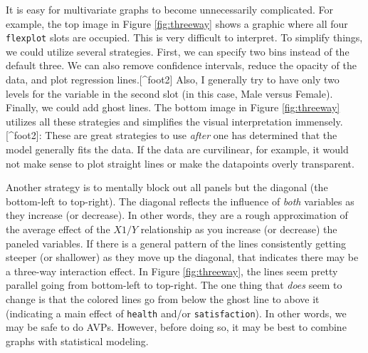 \documentclass[
  english,
  man]{apa6}
\begin{document}
It is easy for multivariate graphs to become unnecessarily complicated. For example, the top image in Figure \ref{fig:threeway} shows a graphic where all four \texttt{flexplot} slots are occupied. This is very difficult to interpret. To simplify things, we could utilize several strategies. First, we can specify two bins instead of the default three. We can also remove confidence intervals, reduce the opacity of the data, and plot regression lines.{[}\^{}foot2{]} Also, I generally try to have only two levels for the variable in the second slot (in this case, Male versus Female). Finally, we could add ghost lines. The bottom image in Figure \ref{fig:threeway} utilizes all these strategies and simplifies the visual interpretation immensely.
{[}\^{}foot2{]}: These are great strategies to use \emph{after} one has determined that the model generally fits the data. If the data are curvilinear, for example, it would not make sense to plot straight lines or make the datapoints overly transparent.

Another strategy is to mentally block out all panels but the diagonal (the bottom-left to top-right). The diagonal reflects the influence of \emph{both} variables as they increase (or decrease). In other words, they are a rough approximation of the average effect of the \(X1/Y\) relationship as you increase (or decrease) the paneled variables. If there is a general pattern of the lines consistently getting steeper (or shallower) as they move up the diagonal, that indicates there may be a three-way interaction effect. In Figure \ref{fig:threeway}, the lines seem pretty parallel going from bottom-left to top-right. The one thing that \emph{does} seem to change is that the colored lines go from below the ghost line to above it (indicating a main effect of \texttt{health} and/or \texttt{satisfaction}). In other words, we may be safe to do AVPs. However, before doing so, it may be best to combine graphs with statistical modeling.

\small
\end{document}
